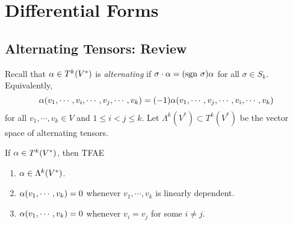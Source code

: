 \section{Differential Forms}
\subsection{Alternating Tensors: Review}
Recall that $\alpha \in T^k(V^*)$ is \textit{alternating} if $\sigma \cdot \alpha = (\mathrm{sgn~} \sigma)\alpha$ for all $\sigma \in S_k$. Equivalently, 
$$\alpha(v_1, \cdots, v_i, \cdots, v_j, \cdots, v_k) = (-1)\alpha(v_1, \cdots, v_j, \cdots, v_i, \cdots, v_k)$$ for all $v_1,\cdots, v_k \in V$ and $1 \leq i < j \leq k$. Let $\Lambda^k(V^*) \subset T^k(V^*)$ be the vector space of alternating tensors. 
\begin{lemma}\label{14.1}
    If $\alpha \in T^k(V^*)$, then TFAE
    \begin{enumerate}
    \item $\alpha \in \Lambda^k(V^*)$.
    \item $\alpha(v_1,\cdots, v_k) = 0$ whenever $v_1, \cdots, v_k$ is linearly dependent. 
    \item $\alpha(v_1, \cdots, v_k) = 0$ whenever $v_i = v_j$ for some $i \neq j$. 
    \end{enumerate}
\end{lemma}
